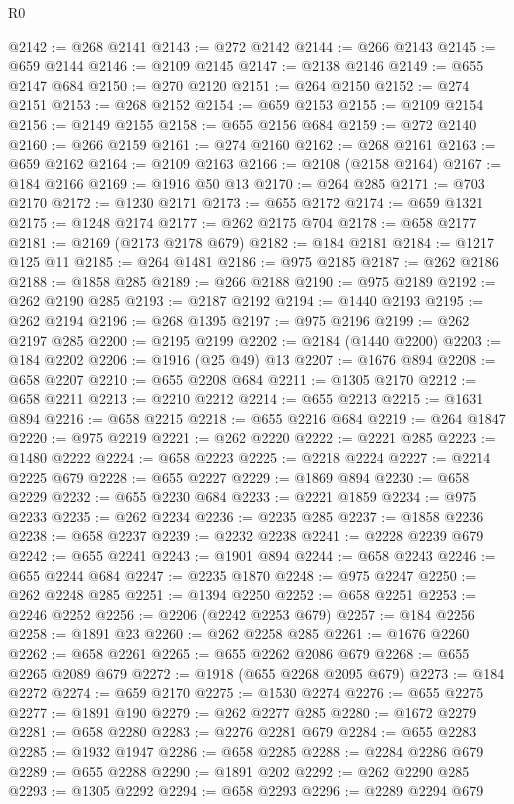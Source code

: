 \begin{lexlean}{R0}
\begin{coremodule}
@2142 := @268 @2141
@2143 := @272 @2142
@2144 := @266 @2143
@2145 := @659 @2144
@2146 := @2109 @2145
@2147 := @2138 @2146
@2149 := @655 @2147 @684
@2150 := @270 @2120
@2151 := @264 @2150
@2152 := @274 @2151
@2153 := @268 @2152
@2154 := @659 @2153
@2155 := @2109 @2154
@2156 := @2149 @2155
@2158 := @655 @2156 @684
@2159 := @272 @2140
@2160 := @266 @2159
@2161 := @274 @2160
@2162 := @268 @2161
@2163 := @659 @2162
@2164 := @2109 @2163
@2166 := @2108 (@2158 @2164)
@2167 := @184 @2166
@2169 := @1916 @50 @13
@2170 := @264 @285
@2171 := @703 @2170
@2172 := @1230 @2171
@2173 := @655 @2172
@2174 := @659 @1321
@2175 := @1248 @2174
@2177 := @262 @2175 @704
@2178 := @658 @2177
@2181 := @2169 (@2173 @2178 @679)
@2182 := @184 @2181
@2184 := @1217 @125 @11
@2185 := @264 @1481
@2186 := @975 @2185
@2187 := @262 @2186
@2188 := @1858 @285
@2189 := @266 @2188
@2190 := @975 @2189
@2192 := @262 @2190 @285
@2193 := @2187 @2192
@2194 := @1440 @2193
@2195 := @262 @2194
@2196 := @268 @1395
@2197 := @975 @2196
@2199 := @262 @2197 @285
@2200 := @2195 @2199
@2202 := @2184 (@1440 @2200)
@2203 := @184 @2202
@2206 := @1916 (@25 @49) @13
@2207 := @1676 @894
@2208 := @658 @2207
@2210 := @655 @2208 @684
@2211 := @1305 @2170
@2212 := @658 @2211
@2213 := @2210 @2212
@2214 := @655 @2213
@2215 := @1631 @894
@2216 := @658 @2215
@2218 := @655 @2216 @684
@2219 := @264 @1847
@2220 := @975 @2219
@2221 := @262 @2220
@2222 := @2221 @285
@2223 := @1480 @2222
@2224 := @658 @2223
@2225 := @2218 @2224
@2227 := @2214 @2225 @679
@2228 := @655 @2227
@2229 := @1869 @894
@2230 := @658 @2229
@2232 := @655 @2230 @684
@2233 := @2221 @1859
@2234 := @975 @2233
@2235 := @262 @2234
@2236 := @2235 @285
@2237 := @1858 @2236
@2238 := @658 @2237
@2239 := @2232 @2238
@2241 := @2228 @2239 @679
@2242 := @655 @2241
@2243 := @1901 @894
@2244 := @658 @2243
@2246 := @655 @2244 @684
@2247 := @2235 @1870
@2248 := @975 @2247
@2250 := @262 @2248 @285
@2251 := @1394 @2250
@2252 := @658 @2251
@2253 := @2246 @2252
@2256 := @2206 (@2242 @2253 @679)
@2257 := @184 @2256
@2258 := @1891 @23
@2260 := @262 @2258 @285
@2261 := @1676 @2260
@2262 := @658 @2261
@2265 := @655 @2262 @2086 @679
@2268 := @655 @2265 @2089 @679
@2272 := @1918 (@655 @2268 @2095 @679)
@2273 := @184 @2272
@2274 := @659 @2170
@2275 := @1530 @2274
@2276 := @655 @2275
@2277 := @1891 @190
@2279 := @262 @2277 @285
@2280 := @1672 @2279
@2281 := @658 @2280
@2283 := @2276 @2281 @679
@2284 := @655 @2283
@2285 := @1932 @1947
@2286 := @658 @2285
@2288 := @2284 @2286 @679
@2289 := @655 @2288
@2290 := @1891 @202
@2292 := @262 @2290 @285
@2293 := @1305 @2292
@2294 := @658 @2293
@2296 := @2289 @2294 @679

\end{coremodule}
\end{lexlean}
